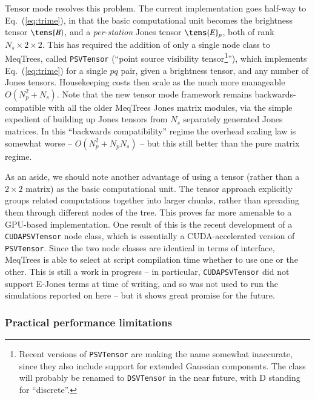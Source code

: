 \documentclass{aa}
\begin{document}
Tensor mode resolves this problem. The current implementation goes half-way to Eq.~(\ref{eq:trime}), in that the basic computational unit becomes the brightness tensor $\tens{B}$, and a \emph{per-station} Jones tensor $\tens{E}_p$, both of rank $N_s\times2\times2$. This has required the addition of only a single node class to MeqTrees, called {\tt PSVTensor} (``point source visibility tensor\footnote{Recent versions of {\tt PSVTensor} are making the name somewhat inaccurate, since they also include support for extended Gaussian components. The class will probably be renamed to {\tt DSVTensor} in the near future, with D standing for ``discrete''.}''), which implements Eq.~(\ref{eq:trime}) for a single $pq$ pair, given a brightness tensor, and any number of Jones tensors. Housekeeping costs then scale as the much more manageable $O(N_p^2+N_s)$. Note that the new tensor mode framework remains backwards-compatible with all the older MeqTrees Jones matrix modules, via the simple expedient of building up Jones 
tensors from $N_s$ separately generated Jones matrices. In this ``backwards compatibility'' regime the overhead scaling law is somewhat worse --  $O(N_p^2+N_p N_s)$ -- but this still better than the pure matrix regime. 

As an aside, we should note another advantage of using a tensor (rather than a $2\times2$ matrix) as the basic computational unit. The tensor approach explicitly groups related computations together into larger chunks, 
rather than spreading them through different nodes of the tree. This proves far more amenable to a GPU-based implementation. One result of this is the recent development of a {\tt CUDAPSVTensor} node class, which is 
essentially a CUDA-accelerated version of {\tt PSVTensor}. Since the two node classes are identical in terms of interface, MeqTrees is able to select at script compilation time whether to use one or the other. This is still a work in progress -- in particular, {\tt CUDAPSVTensor} did not support E-Jones terms at time of writing, and so was not used to run the simulations reported on here -- but it shows great promise for the future.


\subsubsection{Practical performance limitations}
\label{sec:performance}
\end{document}
